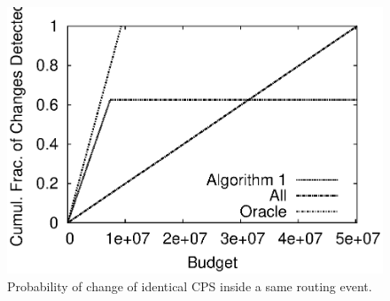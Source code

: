 \begin{figure}
\begin{center}
\includegraphics[width=1.05\columnwidth]{figs/patching/comparative/change_detect.eps}
\caption{Probability of change of identical CPS inside a same routing event.}
\label{fig:savings.comp}
\end{center}
\end{figure}


%
%
%
%
%
%

